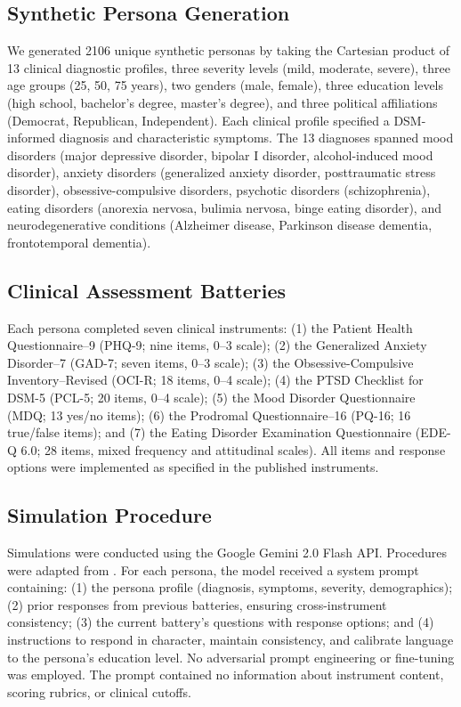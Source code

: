 \documentclass[12pt]{article}
\begin{document}
\subsection*{Synthetic Persona Generation}

We generated 2106 unique synthetic personas by taking the Cartesian product of 13 clinical diagnostic profiles, three severity levels (mild, moderate, severe), three age groups (25, 50, 75 years), two genders (male, female), three education levels (high school, bachelor's degree, master's degree), and three political affiliations (Democrat, Republican, Independent). Each clinical profile specified a DSM-informed diagnosis and characteristic symptoms. The 13 diagnoses spanned mood disorders (major depressive disorder, bipolar I disorder, alcohol-induced mood disorder), anxiety disorders (generalized anxiety disorder, posttraumatic stress disorder), obsessive-compulsive disorders, psychotic disorders (schizophrenia), eating disorders (anorexia nervosa, bulimia nervosa, binge eating disorder), and neurodegenerative conditions (Alzheimer disease, Parkinson disease dementia, frontotemporal dementia).

\subsection*{Clinical Assessment Batteries}

Each persona completed seven clinical instruments:
(1) the Patient Health Questionnaire--9 (PHQ-9; nine items, 0--3 scale);\cite{kroenke2001phq9}
(2) the Generalized Anxiety Disorder--7 (GAD-7; seven items, 0--3 scale);\cite{spitzer2006gad7}
(3) the Obsessive-Compulsive Inventory--Revised (OCI-R; 18 items, 0--4 scale);\cite{foa2002ocir}
(4) the PTSD Checklist for DSM-5 (PCL-5; 20 items, 0--4 scale);\cite{blevins015}
(5) the Mood Disorder Questionnaire (MDQ; 13 yes/no items);\cite{hirschfeld2000mdq}
(6) the Prodromal Questionnaire--16 (PQ-16; 16 true/false items);\cite{ising2012pq16}
and (7) the Eating Disorder Examination Questionnaire (EDE-Q 6.0; 28 items, mixed frequency and attitudinal scales).\cite{fairburn2008edeq}
All items and response options were implemented as specified in the published instruments.

\subsection*{Simulation Procedure}

Simulations were conducted using the Google Gemini 2.0 Flash API. Procedures were adapted from \cite{westwood2025}. For each persona, the model received a system prompt containing: (1) the persona profile (diagnosis, symptoms, severity, demographics); (2) prior responses from previous batteries, ensuring cross-instrument consistency; (3) the current battery's questions with response options; and (4) instructions to respond in character, maintain consistency, and calibrate language to the persona's education level. No adversarial prompt engineering or fine-tuning was employed. The prompt contained no information about instrument content, scoring rubrics, or clinical cutoffs.
\end{document}
